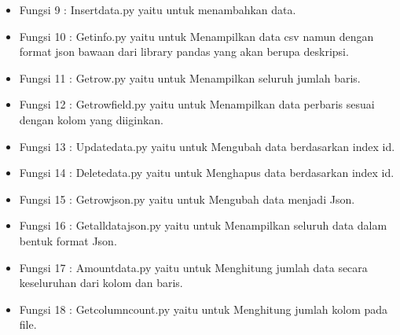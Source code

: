 \begin{enumerate}
\begin{itemize}
            
        \item Fungsi 9 : Insertdata.py yaitu untuk menambahkan data.
            
        \item Fungsi 10 : Getinfo.py yaitu untuk Menampilkan data csv namun dengan format json bawaan dari library pandas yang akan berupa deskripsi.
            
        \item Fungsi 11 : Getrow.py yaitu untuk Menampilkan seluruh jumlah baris.
            
        \item Fungsi 12 : Getrowfield.py yaitu untuk Menampilkan data perbaris sesuai dengan kolom yang diiginkan.
            
        \item Fungsi 13 : Updatedata.py yaitu untuk Mengubah data berdasarkan index id.
            
        \item Fungsi 14 : Deletedata.py yaitu untuk Menghapus data berdasarkan index id.
            
        \item Fungsi 15 : Getrowjson.py yaitu untuk Mengubah data menjadi Json.
            
        \item Fungsi 16 : Getalldatajson.py yaitu untuk Menampilkan seluruh data dalam bentuk format Json.
            
        \item Fungsi 17 : Amountdata.py yaitu untuk Menghitung jumlah data secara keseluruhan dari kolom dan baris.
            
        \item Fungsi 18 : Getcolumncount.py yaitu untuk Menghitung jumlah kolom pada file.

\end{itemize}
\end{enumerate}
